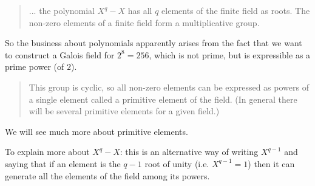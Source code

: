 \documentclass[11pt, oneside]{article}
\begin{document}
\begin{quote}... the polynomial $X^q-X$ has all $q$ elements of the finite field as roots. The non-zero elements of a finite field form a multiplicative group.\end{quote}

So the business about polynomials apparently arises from the fact that we want to construct a Galois field for $2^8 = 256$, which is not prime, but is expressible as a prime power (of $2$).

\begin{quote}This group is cyclic, so all non-zero elements can be expressed as powers of a single element called a primitive element of the field. (In general there will be several primitive elements for a given field.)
\end{quote}

We will see much more about primitive elements.

To explain more about $X^q-X$:  this is an alternative way of writing $X^{q-1}$ and saying that if an element is the $q-1$ root of unity (i.e. $X^{q-1} = 1$) then it can generate all the elements of the field among its powers.
\end{document}

